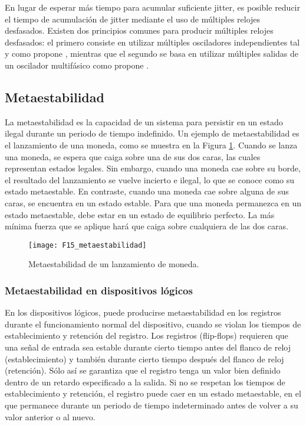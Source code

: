                En lugar de esperar más tiempo para acumular suficiente jitter, es posible reducir el tiempo de acumulación de jitter mediante el uso de múltiples relojes desfasados.  Existen dos principios comunes para producir múltiples relojes desfasados: el primero consiste en utilizar múltiples osciladores independientes tal y como propone \cite{Sunar2007}, mientras que el segundo se basa en utilizar múltiples salidas de un oscilador multifásico como propone \cite{Cherkaoui2013}.

        \subsection{Metaestabilidad}
            
            La metaestabilidad es la capacidad de un sistema para persistir en un estado ilegal durante un periodo de tiempo indefinido. Un ejemplo de metaestabilidad es el lanzamiento de una moneda, como se muestra en la Figura \ref{fig:F15_metaestabilidad}. Cuando se lanza una moneda, se espera que caiga sobre una de sus dos caras, las cuales representan estados legales. Sin embargo, cuando una moneda cae sobre su borde, el resultado del lanzamiento se vuelve incierto e ilegal, lo que se conoce como su estado metaestable. En contraste, cuando una moneda cae sobre alguna de sus caras, se encuentra en un estado estable. Para que una moneda permanezca en un estado metaestable, debe estar en un estado de equilibrio perfecto. La más mínima fuerza que se aplique hará que caiga sobre cualquiera de las dos caras.
            
            \begin{figure}[hbtp]
                \centering
                \texttt{[image: F15\_metaestabilidad]}
                \caption{Metaestabilidad de un lanzamiento de moneda.}
                \label{fig:F15_metaestabilidad}
            \end{figure}

            \subsubsection{Metaestabilidad en dispositivos lógicos}
                En los dispositivos lógicos, puede producirse metaestabilidad en los registros durante el funcionamiento normal del dispositivo, cuando se violan los tiempos de establecimiento y retención del registro. Los registros (flip-flops) requieren que una señal de entrada sea estable durante cierto tiempo antes del flanco de reloj (establecimiento) y también durante cierto tiempo después del flanco de reloj (retención). Sólo así se garantiza que el registro tenga un valor bien definido dentro de un retardo especificado a la salida. Si no se respetan los tiempos de establecimiento y retención, el registro puede caer en un estado metaestable, en el que permanece durante un periodo de tiempo indeterminado antes de volver a su valor anterior o al nuevo.

